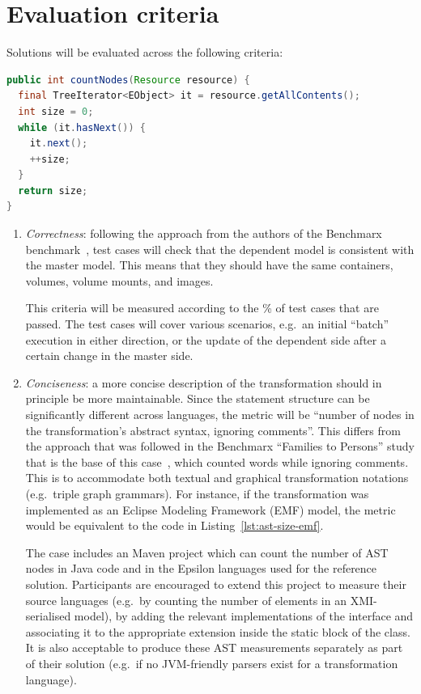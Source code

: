 \documentclass[sigconf,review]{acmart}
\begin{document}
\section{Evaluation criteria}

Solutions will be evaluated across the following criteria:

\begin{lstlisting}[language=Java,float,caption={Sample code for measuring AST/ASG side of transformation rules modelled in EMF},label=lst:ast-size-emf,columns=fullflexible,frame=tb]
public int countNodes(Resource resource) {
  final TreeIterator<EObject> it = resource.getAllContents();
  int size = 0;
  while (it.hasNext()) {
    it.next();
    ++size;
  }
  return size;
}
\end{lstlisting}

\begin{enumerate}
\item \emph{Correctness}: following the approach from the authors of the
  Benchmarx benchmark~\cite{anjorin_benchmarking_2020}, test cases will check
  that the dependent model is consistent with the master model. This means that
  they should have the same containers, volumes, volume mounts, and images.

  This criteria will be measured according to the \% of test cases that are
  passed. The test cases will cover various scenarios, e.g.\ an initial
  ``batch'' execution in either direction, or the update of the dependent side
  after a certain change in the master side.
  
\item \emph{Conciseness}: a more concise description of the transformation
  should in principle be more maintainable. Since the statement structure can be
  significantly different across languages, the metric will be ``number of nodes
  in the transformation's abstract syntax, ignoring comments''. This differs
  from the approach that was followed in the Benchmarx ``Families to Persons''
  study that is the base of this case~\cite{anjorin_families_2017}, which
  counted words while ignoring comments. This is to accommodate both textual and
  graphical transformation notations (e.g.\ triple graph grammars). For
  instance, if the transformation was implemented as an Eclipse Modeling
  Framework (EMF) model, the metric would be equivalent to the code in
  Listing~\ref{lst:ast-size-emf}.

  The case includes an  Maven project which can count the
  number of AST nodes in Java code and in the Epsilon languages used for the
  reference solution. Participants are encouraged to extend this project to
  measure their source languages (e.g.\ by counting the number of elements in an
  XMI-serialised model), by adding the relevant implementations of the
   interface and associating it to the appropriate
  extension inside the static block of the  class. It
  is also acceptable to produce these AST measurements separately as part of
  their solution (e.g.\ if no JVM-friendly parsers exist for a transformation
  language).


\end{enumerate}
\end{document}
